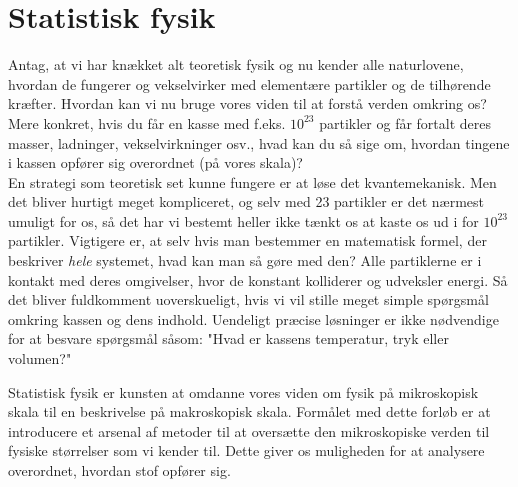 \chapter{Statistisk fysik}
Antag, at vi har knækket alt teoretisk fysik og nu kender alle naturlovene, hvordan de fungerer og vekselvirker med elementære partikler og de tilhørende kræfter. Hvordan kan vi nu bruge vores viden til at forstå verden omkring os? Mere konkret, hvis du får en kasse med f.eks. $10^{23}$ partikler og får fortalt deres masser, ladninger, vekselvirkninger osv., hvad kan du så sige om, hvordan tingene i kassen opfører sig overordnet (på vores skala)?\\[12pt]
En strategi som teoretisk set kunne fungere er at løse det kvantemekanisk. Men det bliver hurtigt meget kompliceret, og selv med 23 partikler er det nærmest umuligt for os, så det har vi bestemt heller ikke tænkt os at kaste os ud i for $10^{23}$ partikler. %
Vigtigere er, at selv hvis man bestemmer en matematisk formel, der beskriver \emph{hele} systemet, hvad kan man så gøre med den? Alle partiklerne er i kontakt med deres omgivelser, hvor de konstant kolliderer og udveksler energi. Så det bliver fuldkomment uoverskueligt, hvis vi vil stille meget simple spørgsmål omkring kassen og dens indhold. %
Uendeligt præcise løsninger er ikke nødvendige for at besvare spørgsmål såsom: "Hvad er kassens temperatur, tryk eller volumen?"%

Statistisk fysik er kunsten at omdanne vores viden om fysik på mikroskopisk skala til en beskrivelse på makroskopisk skala. Formålet med dette forløb er at introducere et arsenal af metoder til at oversætte den mikroskopiske verden til fysiske størrelser som vi kender til. Dette giver os muligheden for at analysere overordnet, hvordan stof opfører sig.



